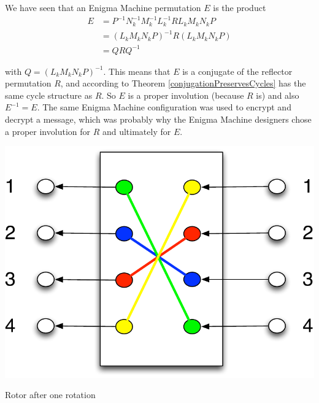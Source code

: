 We have seen that an Enigma Machine permutation $E$ is the product
\begin{align*}
E &= P^{-1} N_k^{-1} M_k^{-1} L_k^{-1} R L_k M_k N_k P \\
  &= (L_k M_k N_k P)^{-1} R (L_k M_k N_k P) \\
  &= Q R Q^{-1}
\end{align*}

with $Q = (L_k M_k N_k P)^{-1}$. This means that $E$ is a conjugate of the reflector permutation $R$, and according to Theorem \ref{conjugationPreservesCycles} has the same cycle structure as $R$. So $E$ is a proper involution (because $R$ is) and also $E^{-1}=E$. The same Enigma Machine configuration was used to encrypt and decrypt a message, which was probably why the Enigma Machine designers chose a proper involution for $R$ and ultimately for $E$.

\begin{marginfigure}[0.5in]
\includegraphics[scale=0.4]{rotorMotionAfter.pdf}
\caption{Rotor after one rotation}
\label{fig:rotorMotionAfter}
\end{marginfigure}

